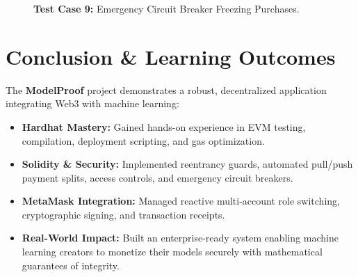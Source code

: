 \documentclass[12pt,a4paper]{article}
\begin{document}
\newpage
\begin{figure}[H]
\centering
\caption{\textbf{Test Case 9:} Emergency Circuit Breaker Freezing Purchases.}
\label{fig:tc9_pause}
\end{figure}

\section{Conclusion \& Learning Outcomes}

The \textbf{ModelProof} project demonstrates a robust, decentralized application integrating Web3 with machine learning:
\begin{itemize}[leftmargin=1.5em]
    \item \textbf{Hardhat Mastery:} Gained hands-on experience in EVM testing, compilation, deployment scripting, and gas optimization.
    \item \textbf{Solidity \& Security:} Implemented reentrancy guards, automated pull/push payment splits, access controls, and emergency circuit breakers.
    \item \textbf{MetaMask Integration:} Managed reactive multi-account role switching, cryptographic signing, and transaction receipts.
    \item \textbf{Real-World Impact:} Built an enterprise-ready system enabling machine learning creators to monetize their models securely with mathematical guarantees of integrity.
\end{itemize}
\end{document}
